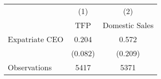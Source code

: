 \begin{tabular}{l*{2}{c}}
\hline\hline
                    &\multicolumn{1}{c}{(1)}&\multicolumn{1}{c}{(2)}\\
                    &\multicolumn{1}{c}{TFP}&\multicolumn{1}{c}{Domestic Sales}\\
\hline
Expatriate CEO      &       0.204&       0.572\\
                    &     (0.082)&     (0.209)\\
\hline
Observations        &        5417&        5371\\
\hline\hline
\end{tabular}
